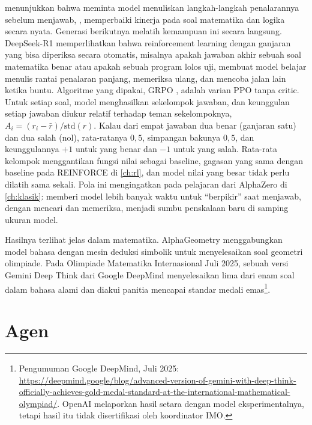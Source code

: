 \citet{wei2022} menunjukkan bahwa meminta model menuliskan langkah-langkah penalarannya sebelum menjawab,
, memperbaiki kinerja pada soal matematika dan logika secara nyata. Generasi
berikutnya melatih kemampuan ini secara langsung. DeepSeek-R1 \citep{deepseek2025} memperlihatkan bahwa
reinforcement learning dengan ganjaran yang bisa diperiksa secara otomatis, misalnya apakah jawaban akhir
sebuah soal matematika benar atau apakah sebuah program lolos uji, membuat model belajar menulis rantai
penalaran panjang, memeriksa ulang, dan mencoba jalan lain ketika buntu. Algoritme yang dipakai, GRPO \citep{shao2024}, adalah varian PPO tanpa
critic. Untuk setiap soal, model menghasilkan sekelompok jawaban, dan keunggulan setiap jawaban diukur relatif
terhadap teman sekelompoknya, $A_i=(r_i-\bar r)/\mathrm{std}(r)$. Kalau dari empat jawaban dua benar (ganjaran satu)
dan dua salah (nol), rata-ratanya $0{,}5$, simpangan bakunya $0{,}5$, dan keunggulannya $+1$ untuk yang benar dan $-1$
untuk yang salah. Rata-rata kelompok menggantikan fungsi nilai sebagai baseline, gagasan yang sama dengan baseline
pada REINFORCE di \cref{ch:rl}, dan model nilai yang besar tidak perlu dilatih sama sekali. Pola ini mengingatkan pada
pelajaran dari AlphaZero di \cref{ch:klasik}: memberi model lebih banyak waktu untuk ``berpikir'' saat
menjawab, dengan mencari dan memeriksa, menjadi sumbu penskalaan baru di samping ukuran model.

Hasilnya terlihat jelas dalam matematika. AlphaGeometry \citep{trinh2024} menggabungkan model bahasa dengan
mesin deduksi simbolik untuk menyelesaikan soal geometri olimpiade. Pada Olimpiade Matematika
Internasional Juli 2025, sebuah versi Gemini Deep Think dari Google DeepMind menyelesaikan lima dari
enam soal dalam bahasa alami dan diakui panitia mencapai standar medali emas\footnote{Pengumuman Google
DeepMind, Juli 2025: \url{https://deepmind.google/blog/advanced-version-of-gemini-with-deep-think-officially-achieves-gold-medal-standard-at-the-international-mathematical-olympiad/}.
OpenAI melaporkan hasil setara dengan model eksperimentalnya, tetapi hasil itu tidak disertifikasi oleh
koordinator IMO.}.

\section{Agen}

